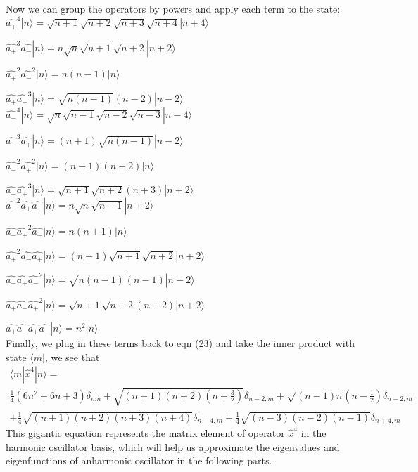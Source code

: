 \documentclass[]{article}
\begin{document}
Now we can group the operators by powers and apply each term to the state:\\

$\hat{a_+}^4 | n \rangle = \sqrt{n+1}\sqrt{n+2}\sqrt{n+3}\sqrt{n+4}  | n+4\rangle$

$\hat{a_+}^3\hat{a_-} | n \rangle = n\sqrt{n}\sqrt{n+1}\sqrt{n+2}  | n+2\rangle$

$\hat{a_+}^2\hat{a_-}^2 | n \rangle = n(n-1)  | n\rangle$

$\hat{a_+}\hat{a_-}^3 | n \rangle = \sqrt{n(n-1)}(n-2)  | n-2\rangle$ 
\\

$\hat{a_-}^4 | n \rangle = \sqrt{n}\sqrt{n-1}\sqrt{n-2}\sqrt{n-3}  | n-4\rangle$

$\hat{a_-}^3\hat{a_+} | n \rangle = (n+1)\sqrt{n(n-1)} | n-2\rangle$

$\hat{a_-}^2\hat{a_+}^2 | n \rangle = (n+1)(n+2) |n\rangle$

$\hat{a_-}\hat{a_+}^3 | n \rangle = \sqrt{n+1}\sqrt{n+2} (n+3) |n+2\rangle$\\


$\hat{a_-}^2\hat{a_+}\hat{a_-} | n \rangle = n\sqrt{n}\sqrt{n-1} |n+2\rangle$


$\hat{a_-}\hat{a_+}^2\hat{a_-} | n \rangle = n(n+1) |n\rangle$


$\hat{a_+}^2\hat{a_-}\hat{a_+} | n \rangle = (n+1)\sqrt{n+1}\sqrt{n+2} |n+2\rangle$


$\hat{a_-}\hat{a_+}\hat{a_-}^2| n \rangle = \sqrt{n(n-1)}(n-1) |n-2\rangle$

$\hat{a_+}\hat{a_-}\hat{a_+}^2| n \rangle = \sqrt{n+1}\sqrt{n+2}(n+2) |n+2\rangle$

$\hat{a_+}\hat{a_-}\hat{a_+}\hat{a_-}| n \rangle = n^2 |n\rangle$
\\

Finally, we plug in these terms back to eqn (23) and take the inner product with state $\langle m|$, we see that 
\begin{equation}
\begin{aligned}
\langle m|\hat{x}^4|n\rangle = \\
\frac{1}{4}(6n^2 + 6n +3)\delta_{nm} + \sqrt{(n+1)(n+2)(n+\frac{3}{2})}\delta_{n-2,m} + \sqrt{(n-1)n}(n - \frac{1}{2})\delta_{n-2,m} \\+ \frac{1}{4} \sqrt{(n+1)(n+2)(n+3)(n+4)}\delta_{n-4,m} 
+  \frac{1}{4} \sqrt{(n-3)(n-2)(n-1)}\delta_{n+4,m}	
\end{aligned}
\end{equation}
This gigantic equation represents the matrix element of operator $\hat{x}^4$ in the harmonic oscillator basis, which will help us approximate the eigenvalues and eigenfunctions of anharmonic oscillator in the following parts. 
\end{document}
